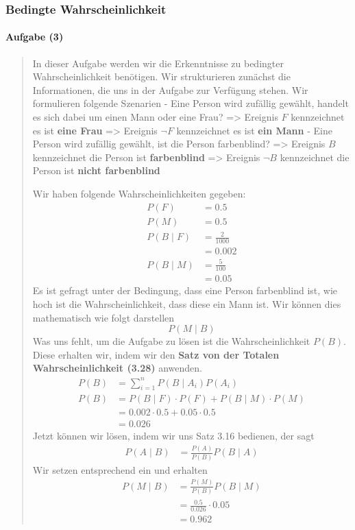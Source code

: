 \documentclass[
]{article}
\begin{document}
\subsubsection{Bedingte
Wahrscheinlichkeit}\label{bedingte-wahrscheinlichkeit}

\paragraph{Aufgabe (3)}\label{aufgabe-3}

\begin{quote}
In dieser Aufgabe werden wir die Erkenntnisse zu bedingter
Wahrscheinlichkeit benötigen. Wir strukturieren zunächst die
Informationen, die uns in der Aufgabe zur Verfügung stehen. Wir
formulieren folgende Szenarien - Eine Person wird zufällig gewählt,
handelt es sich dabei um einen Mann oder eine Frau? =\textgreater{}
Ereignis \(F\) kennzeichnet es ist \textbf{eine Frau} =\textgreater{}
Ereignis \(\lnot F\) kennzeichnet es ist \textbf{ein Mann} - Eine Person
wird zufällig gewählt, ist die Person farbenblind? =\textgreater{}
Ereignis \(B\) kennzeichnet die Person ist \textbf{farbenblind}
=\textgreater{} Ereignis \(\lnot B\) kennzeichnet die Person ist
\textbf{nicht farbenblind}

Wir haben folgende Wahrscheinlichkeiten gegeben: \[\begin{align}
P(F) &= 0.5 \\
P(M) &= 0.5\\
P(B\;|\;F) &= \frac{2}{1000}  \\
   &= 0.002 \\
P(B\;|\;M) &= \frac{5}{100} \\
&= 0.05
\end{align}\] Es ist gefragt unter der Bedingung, dass eine Person
farbenblind ist, wie hoch ist die Wahrscheinlichkeit, dass diese ein
Mann ist. Wir können dies mathematisch wie folgt darstellen
\[P(M\;|\;B)\] Was uns fehlt, um die Aufgabe zu lösen ist die
Wahrscheinlichkeit \(P(B)\). Diese erhalten wir, indem wir den
\textbf{Satz von der Totalen Wahrscheinlichkeit (3.28)} anwenden.
\[\begin{align}
P(B) &= \sum_{i=1}^n P(B\;|\;A_{i})P(A_{i}) \\
P(B) &=P(B\;|\;F)\cdot P(F) + P(B\;|\;M) \cdot P(M) \\
     &= 0.002 \cdot 0.5 + 0.05 \cdot 0.5 \\
     &= 0.026
\end{align}\] Jetzt können wir lösen, indem wir uns Satz 3.16 bedienen,
der sagt \[\begin{align}
P(A\;|\;B) &=\frac{P(A)}{P(B)}P(B\;|\;A)
\end{align}\] Wir setzen entsprechend ein und erhalten \[\begin{align}
P(M\;|\;B) &=\frac{P(M)}{P(B)}P(B\;|\;M) \\
  &= \frac{0.5}{0.026} \cdot 0.05 \\
&= 0.962
\end{align}\]
\end{quote}
\end{document}
